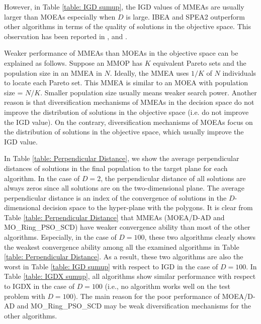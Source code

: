\documentclass[conference]{IEEEtran}
\begin{document}
 However, in Table \ref{table: IGD sumup}, the IGD values of MMEAs are usually larger than MOEAs especially when $D$ is large. IBEA and SPEA2 outperform other algorithms in terms of the quality of solutions in the objective space. This observation has been reported in \cite{liang2016multimodal}, \cite{tanabe2018decomposition} and \cite{shir2009enhancing}. 
 
 Weaker performance of MMEAs than MOEAs in the objective space can be explained as follows. Suppose an MMOP has $K$ equivalent Pareto sets and the population size in an MMEA in $N$. Ideally, the MMEA uses $1/K$ of $N$ individuals to locate each Pareto set. This MMEA is similar to an MOEA with population size = $N/K$. Smaller population size usually means weaker search power. Another reason is that diversification mechanisms of MMEAs in the decision space do not improve the distribution of solutions in the objective space (i.e. do not improve the IGD value). On the contrary, diversification mechanisms of MOEAs focus on the distribution of solutions in the objective space, which usually improve the IGD value. 
 
 In Table \ref{table: Perpendicular Distance}, we show the average perpendicular distances of solutions in the final population to the target plane for each algorithm. In the case of $D=2$, the perpendicular distance of all solutions are always zeros since all solutions are on the two-dimensional plane. The average perpendicular distance is an index of the convergence of solutions in the $D$-dimensional decision space to the hyper-plane with the polygons. It is clear from Table \ref{table: Perpendicular Distance} that  MMEAs (MOEA/D-AD and MO\_Ring\_PSO\_SCD) have weaker convergence ability than most of the other algorithms. Especially, in the case of $D=100$, these two algorithms clearly shows the weakest convergence ability among all the examined algorithms in Table \ref{table: Perpendicular Distance}. As a result, these two algorithms are also the worst in Table \ref{table: IGD sumup} with respect to IGD in the case of $D = 100$. In Table \ref{table: IGDX sumup}, all algorithms show similar performance with respect to IGDX in the case of $D=100$ (i.e., no algorithm works well on the test problem with $D=100$). The main reason for the poor performance of MOEA/D-AD and MO\_Ring\_PSO\_SCD may be weak diversification mechanisms for the other algorithms.
\end{document}
